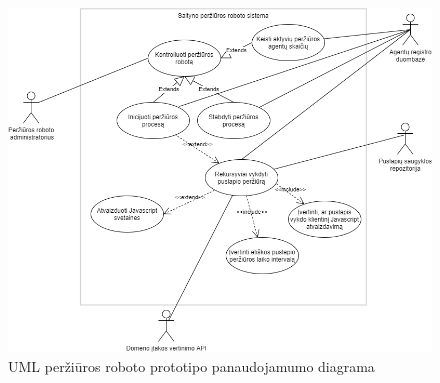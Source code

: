 \begin{figure}[htp!]
\centering
\includegraphics[scale=0.6]{img/Use_case_diagram.png}
\caption{UML peržiūros roboto prototipo panaudojamumo diagrama}
\label{fig:use_case_diagram}
\end{figure}
